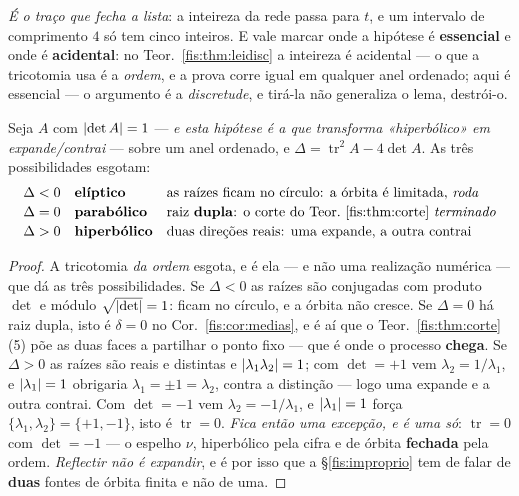 \documentclass[livro.tex]{subfiles}
\begin{document}
\medskip\noindent \emph{É o traço que fecha a lista}: a inteireza da rede passa
para $t$, e um intervalo de comprimento $4$ só tem cinco inteiros. E vale marcar
onde a hipótese é \textbf{essencial} e onde é \textbf{acidental}: no
Teor.~\ref{fis:thm:leidisc} a inteireza é acidental --- o que a tricotomia usa é a
\emph{ordem}, e a prova corre igual em qualquer anel ordenado; aqui é essencial
--- o argumento é a \emph{discretude}, e tirá-la não generaliza o lema,
destrói-o.

\begin{teorema}\label{fis:thm:leidisc}
Seja $A$ com $\lvert \det A\rvert=1$ --- \emph{e esta hipótese é a que transforma
«hiperbólico» em expande/contrai} --- sobre um anel ordenado, e
$\Delta=\operatorname{tr}^{2}A-4\det A$. As três possibilidades esgotam:
\[
\begin{array}{lll}
\Delta<0 & \textbf{elíptico} & \text{as raízes ficam no círculo: a órbita é limitada, \emph{roda}}\\[2pt]
\Delta=0 & \textbf{parabólico} & \text{raiz \textbf{dupla}: o corte do Teor.~\ref{fis:thm:corte} \emph{terminado}}\\[2pt]
\Delta>0 & \textbf{hiperbólico} & \text{duas direções reais: uma expande, a outra contrai}
\end{array}
\]
\end{teorema}

\begin{proof}
A tricotomia \emph{da ordem} esgota, e é ela --- e não uma realização numérica ---
que dá as três possibilidades. Se $\Delta<0$ as raízes são conjugadas com produto
$\det$ e módulo $\sqrt{\lvert \det\rvert}=1$: ficam no círculo, e a órbita não cresce. Se
$\Delta=0$ há raiz dupla, isto é $\delta=0$ no Cor.~\ref{fis:cor:medias}, e é aí
que o Teor.~\ref{fis:thm:corte}(5) põe as duas faces a partilhar o ponto fixo ---
que é onde o processo \textbf{chega}. Se
$\Delta>0$ as raízes são reais e distintas e $\lvert \lambda_1\lambda_2\rvert=1$; com
$\det=+1$ vem $\lambda_2=1/\lambda_1$, e $\lvert \lambda_1\rvert=1$ obrigaria
$\lambda_1=\pm1=\lambda_2$, contra a distinção --- logo uma expande e a outra
contrai. Com $\det=-1$ vem $\lambda_2=-1/\lambda_1$, e $\lvert \lambda_1\rvert=1$ força
$\{\lambda_1,\lambda_2\}=\{+1,-1\}$, isto é $\operatorname{tr}=0$. \emph{Fica
então uma excepção, e é uma só}: $\operatorname{tr}=0$ com $\det=-1$ --- o espelho
$\nu$, hiperbólico pela cifra e de órbita \textbf{fechada} pela ordem.
\emph{Reflectir não é expandir}, e é por isso que a §\ref{fis:improprio} tem de
falar de \textbf{duas} fontes de órbita finita e não de uma.\end{proof}
\end{document}

